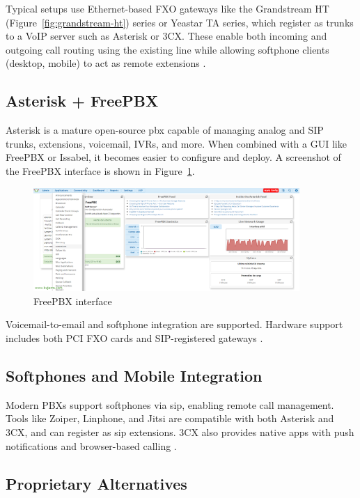 Typical setups use Ethernet-based FXO gateways like the Grandstream HT (Figure~\ref{fig:grandstream-ht}) series or Yeastar TA series, which register as trunks to a VoIP server such as Asterisk or 3CX. These enable both incoming and outgoing call routing using the existing line while allowing softphone clients (desktop, mobile) to act as remote extensions \cite{YeastarFXOvFSX2024,AsteriskCommunity2024}.

\subsection{Asterisk + FreePBX}

Asterisk is a mature open-source \gls{pbx} capable of managing analog and SIP trunks, extensions, voicemail, IVRs, and more. When combined with a GUI like FreePBX or Issabel, it becomes easier to configure and deploy. A screenshot of the FreePBX interface is shown in Figure~\ref{fig:freepbx-ui}.

\begin{figure}[H]
  \centering
  \includegraphics[width=0.9\textwidth]{imaxes/freepbx-ui.png}
  \caption{FreePBX interface}
  \label{fig:freepbx-ui}
\end{figure}

Voicemail-to-email and softphone integration are supported. Hardware support includes both PCI FXO cards and SIP-registered gateways \cite{AsteriskFeatures}.
\subsection{Softphones and Mobile Integration}

Modern PBXs support softphones via \gls{sip}, enabling remote call management. Tools like Zoiper, Linphone, and Jitsi are compatible with both Asterisk and 3CX, and can register as \gls{sip} extensions. 3CX also provides native apps with push notifications and browser-based calling \cite{Zoiper_Compatibility}.

\subsection{Proprietary Alternatives}

